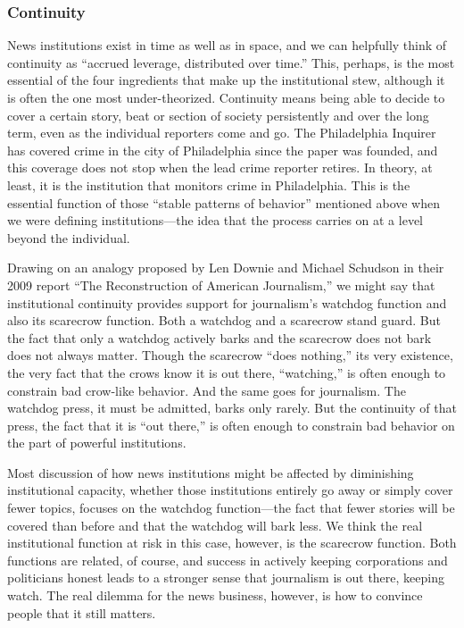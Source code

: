 \subsubsection{Continuity}
News institutions exist in time as well as in space, and we can helpfully think
of continuity as ``accrued leverage, distributed over time.'' This, perhaps, is
the most essential of the four ingredients that make up the institutional stew,
although it is often the one most under-theorized. Continuity means being
able to decide to cover a certain story, beat or section of society persistently and
over the long term, even as the individual reporters come and go. The Philadelphia
Inquirer has covered crime in the city of Philadelphia since the paper was
founded, and this coverage does not stop when the lead crime reporter retires.
In theory, at least, it is the institution that monitors crime in Philadelphia. This
is the essential function of those ``stable patterns of behavior'' mentioned above
when we were defining institutions—the idea that the process carries on at a
level beyond the individual.

Drawing on an analogy proposed by Len Downie and Michael Schudson in their
2009 report ``The Reconstruction of American Journalism,'' we might say that
institutional continuity provides support for journalism’s watchdog function and
also its scarecrow function. Both a watchdog and a scarecrow stand guard. But the
fact that only a watchdog actively barks and the scarecrow does not bark does not
always matter. Though the scarecrow ``does nothing,'' its very existence, the very fact that the crows know it is out there, ``watching,'' is often enough to constrain
bad crow-like behavior. And the same goes for journalism. The watchdog press,
it must be admitted, barks only rarely. But the continuity of that press, the fact
that it is ``out there,'' is often enough to constrain bad behavior on the part of
powerful institutions.

Most discussion of how news institutions might be affected by diminishing institutional
capacity, whether those institutions entirely go away or simply cover
fewer topics, focuses on the watchdog function—the fact that fewer stories will
be covered than before and that the watchdog will bark less. We think the real
institutional function at risk in this case, however, is the scarecrow function. Both
functions are related, of course, and success in actively keeping corporations and
politicians honest leads to a stronger sense that journalism is out there, keeping
watch. The real dilemma for the news business, however, is how to convince
people that it still matters.

